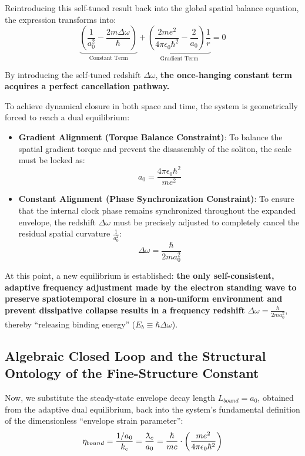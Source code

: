 \documentclass[12pt, a4paper]{article}
\newcommand{\lambdabar}{{\mkern0.75mu\mathchar '26\mkern -9.75mu\lambda}}
\begin{document}
Reintroducing this self-tuned result back into the global spatial balance equation, the expression transforms into:
\begin{equation}
    \underbrace{\left( \frac{1}{a_0^2} - \frac{2 m \Delta\omega}{\hbar} \right)}_{\text{Constant Term}} + \underbrace{\left( \frac{2 m e^2}{4\pi\epsilon_0 \hbar^2} - \frac{2}{a_0} \right) \frac{1}{r}}_{\text{Gradient Term}} = 0 
\end{equation}

By introducing the self-tuned redshift $\Delta\omega$, \textbf{the once-hanging constant term acquires a perfect cancellation pathway.}

To achieve dynamical closure in both space and time, the system is geometrically forced to reach a dual equilibrium:
\begin{itemize}
    \item \textbf{Gradient Alignment (Torque Balance Constraint)}: To balance the spatial gradient torque and prevent the disassembly of the soliton, the scale must be locked as:
    \begin{equation}
        a_0 = \frac{4\pi\epsilon_0 \hbar^2}{m e^2} 
    \end{equation}
    \item \textbf{Constant Alignment (Phase Synchronization Constraint)}: To ensure that the internal clock phase remains synchronized throughout the expanded envelope, the redshift $\Delta\omega$ must be precisely adjusted to completely cancel the residual spatial curvature $\frac{1}{a_0^2}$:
    \begin{equation}
        \Delta\omega = \frac{\hbar}{2 m a_0^2} 
    \end{equation}
\end{itemize}

At this point, a new equilibrium is established: \textbf{the only self-consistent, adaptive frequency adjustment made by the electron standing wave to preserve spatiotemporal closure in a non-uniform environment and prevent dissipative collapse results in a frequency redshift} $\Delta\omega = \frac{\hbar}{2 m a_0^2}$, thereby ``releasing binding energy'' ($E_b \equiv \hbar \Delta\omega$).

\subsection{Algebraic Closed Loop and the Structural Ontology of the Fine-Structure Constant}

Now, we substitute the steady-state envelope decay length $L_{bound} = a_0$, obtained from the adaptive dual equilibrium, back into the system's fundamental definition of the dimensionless ``envelope strain parameter'':
\begin{equation}
    \eta_{bound} = \frac{1/a_0}{k_c} = \frac{\lambdabar_c}{a_0} = \frac{\hbar}{mc} \cdot \left( \frac{m e^2}{4\pi\epsilon_0 \hbar^2} \right) 
\end{equation}
\end{document}
